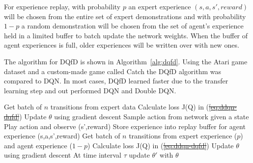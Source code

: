 \documentclass[12pt,american]{report}
\providecommand{\DIFaddtex}[1]{{\protect\color{blue}\uwave{#1}}} %
\providecommand{\DIFdeltex}[1]{{\protect\color{red}\sout{#1}}}                      %
\providecommand{\DIFaddbegin}{} %
\providecommand{\DIFaddend}{} %
\providecommand{\DIFdelbegin}{} %
\providecommand{\DIFdelend}{} %
\providecommand{\DIFadd}[1]{\texorpdfstring{\DIFaddtex{#1}}{#1}} %
\providecommand{\DIFdel}[1]{\texorpdfstring{\DIFdeltex{#1}}{}} %
\newcommand{\DIFscaledelfig}{0.5}
\newlength{\DIFdelgraphicswidth} %
\newlength{\DIFdelgraphicsheight} %
\newcommand{\DIFaddincludegraphics}[2][]{{\color{blue}\fbox{\DIFOincludegraphics[#1]{#2}}}} %
\newcommand{\DIFdelincludegraphics}[2][]{%
\sbox{\DIFdelgraphicsbox}{\DIFOincludegraphics[#1]{#2}}%
\settoboxwidth{\DIFdelgraphicswidth}{\DIFdelgraphicsbox} %
\settoboxtotalheight{\DIFdelgraphicsheight}{\DIFdelgraphicsbox} %
\scalebox{\DIFscaledelfig}{%
\parbox[b]{\DIFdelgraphicswidth}{\usebox{\DIFdelgraphicsbox}\\[-\baselineskip] \rule{\DIFdelgraphicswidth}{0em}}\llap{\resizebox{\DIFdelgraphicswidth}{\DIFdelgraphicsheight}{%
\setlength{\unitlength}{\DIFdelgraphicswidth}%
\begin{picture}(1,1)%
\thicklines\linethickness{2pt} %
{\color[rgb]{1,0,0}\put(0,0){\framebox(1,1){}}}%
{\color[rgb]{1,0,0}\put(0,0){\line( 1,1){1}}}%
{\color[rgb]{1,0,0}\put(0,1){\line(1,-1){1}}}%
\end{picture}%
}\hspace*{3pt}}} %
} %
\DeclareRobustCommand{\DIFaddbegin}{\DIFOaddbegin \let\includegraphics\DIFaddincludegraphics} %
\DeclareRobustCommand{\DIFaddend}{\DIFOaddend \let\includegraphics\DIFOincludegraphics} %
\DeclareRobustCommand{\DIFdelbegin}{\DIFOdelbegin \let\includegraphics\DIFdelincludegraphics} %
\DeclareRobustCommand{\DIFdelend}{\DIFOaddend \let\includegraphics\DIFOincludegraphics} %
\begin{document}
For experience replay, with probability $p$ an expert experience $(s,a,s',reward)$ will be chosen from the entire set of expert demonstrations and with probability $1-p$ a random demonstration will be chosen from the set of agent's experience held in a limited buffer to batch update the network weights.  When the buffer of agent experiences is full, older experiences will be written over with new ones.  

The algorithm for DQfD is shown in Algorithm~\ref{alg:dqfd}. Using the Atari game dataset and a custom-made game called Catch the DQfD algorithm was compared to DQN.  In most cases, DQfD learned faster due to the transfer learning step and out performed DQN and Double DQN.
\begin{algorithm}
\caption{DQfD\DIFaddbegin \DIFadd{~\mbox{%
\cite{hester2017learning}}%
}\DIFaddend }
\label{alg:dqfd}
\begin{algorithmic} 
\State Get batch of $n$ transitions from expert data
\State Calculate loss J(Q) in (\DIFdelbegin \DIFdel{\ref{eq:ddqn-dqfd}}\DIFdelend \DIFaddbegin \DIFadd{\ref{eq:ddqn-dqfd-3}}\DIFaddend )
\State Update $\theta$ using gradient descent
\EndFor
{}
\State Sample action from network given a state
\State Play action and observe (s',reward)
\State Store experience into replay buffer for agent experience (s,a,s',reward)
\State Get batch of $n$ transitions from expert experience ($p$) and agent experience ($1-p$)
\State Calculate loss J(Q) in (\DIFdelbegin \DIFdel{\ref{eq:ddqn-dqfd}}\DIFdelend \DIFaddbegin \DIFadd{\ref{eq:ddqn-dqfd-3}}\DIFaddend )
\State Update $\theta$ using gradient descent
\State At time interval $\tau$ update $\theta'$ with $\theta$
\EndFor
\end{algorithmic}
\end{algorithm}
\end{document}
